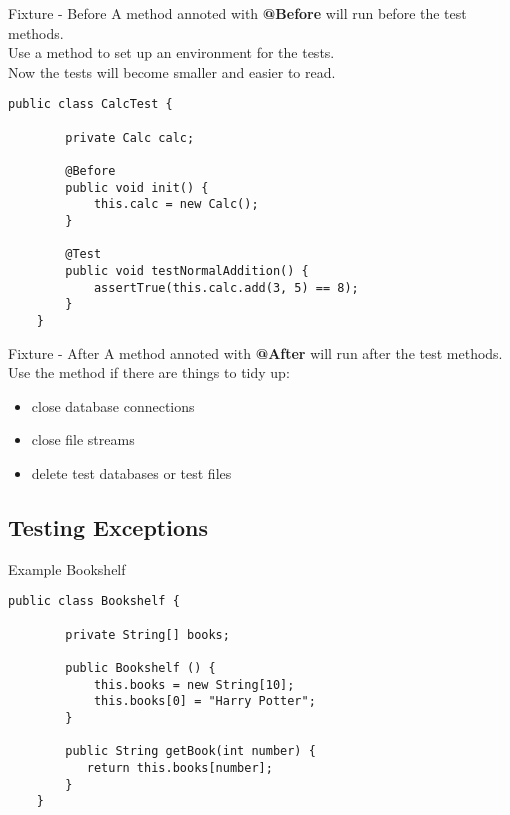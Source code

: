 \begin{frame}[fragile]{Fixture - Before}
	A method annoted with \textbf{@Before} will run before the test methods. \\
	Use a method to set up an environment for the tests. \\
	Now the tests will become smaller and easier to read.
	\begin{lstlisting}[basicstyle=\ttfamily\scriptsize, escapechar=!]
	public class CalcTest {
	
	    private Calc calc;
	    
	    @Before
	    public void init() {
	        this.calc = new Calc();	    
	    }
	    
	    @Test
	    public void testNormalAddition() {
	        assertTrue(this.calc.add(3, 5) == 8);
	    }
	}
	\end{lstlisting}
\end{frame}

\begin{frame}[fragile]{Fixture - After}
	A method annoted with \textbf{@After} will run after the test methods. \\
	Use the method if there are things to tidy up:
	\begin{itemize}
		\item close database connections
		\item close file streams
		\item delete test databases or test files
	\end{itemize}
\end{frame}

\subsection{Testing Exceptions}
\begin{frame}[fragile]{Example Bookshelf}
	\begin{lstlisting}[basicstyle=\ttfamily\scriptsize]
	public class Bookshelf {
	
	    private String[] books;
	
	    public Bookshelf () {
	        this.books = new String[10];
	        this.books[0] = "Harry Potter";
	    }

	    public String getBook(int number) {
	       return this.books[number];
	    }
	}
	\end{lstlisting}
\end{frame}

